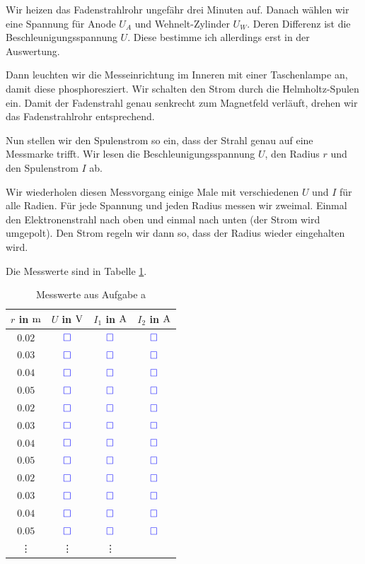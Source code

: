 \documentclass[11pt]{article}
\newcommand{\messwert}{\textcolor{blue}{\square}}
\begin{document}
\label{Durchführung-a}

Wir heizen das Fadenstrahlrohr ungefähr drei Minuten auf. Danach wählen wir
eine Spannung für Anode $U_A$ und Wehnelt-Zylinder $U_W$. Deren Differenz ist
die Beschleunigungsspannung $U$. Diese bestimme ich allerdings erst in der
Auswertung.

Dann leuchten wir die Messeinrichtung im Inneren mit einer Taschenlampe an,
damit diese phosphoresziert. Wir schalten den Strom durch die Helmholtz-Spulen
ein. Damit der Fadenstrahl genau senkrecht zum Magnetfeld verläuft, drehen wir
das Fadenstrahlrohr entsprechend.

Nun stellen wir den Spulenstrom so ein, dass der Strahl genau auf eine
Messmarke trifft. Wir lesen die Beschleunigungsspannung $U$, den Radius $r$ und
den Spulenstrom $I$ ab.

Wir wiederholen diesen Messvorgang einige Male mit verschiedenen $U$ und $I$
für alle Radien. Für jede Spannung und jeden Radius messen wir zweimal. Einmal
den Elektronenstrahl nach oben und einmal nach unten (der Strom wird umgepolt).
Den Strom regeln wir dann so, dass der Radius wieder eingehalten wird.

Die Messwerte sind in Tabelle \ref{table:Aufgabe-a}.

\begin{table}[H]
	\centering

	\begin{tabular}{cccc}
		$r$ in $\unit m$ & $U$ in $\unit V$ & $I_1$ in $\unit A$ & $I_2$ in $\unit A$ \\
		\hline
		$0.02$ & $\messwert$ & $\messwert$ & $\messwert$ \\
		$0.03$ & $\messwert$ & $\messwert$ & $\messwert$ \\
		$0.04$ & $\messwert$ & $\messwert$ & $\messwert$ \\
		$0.05$ & $\messwert$ & $\messwert$ & $\messwert$ \\
		\hline
		$0.02$ & $\messwert$ & $\messwert$ & $\messwert$ \\
		$0.03$ & $\messwert$ & $\messwert$ & $\messwert$ \\
		$0.04$ & $\messwert$ & $\messwert$ & $\messwert$ \\
		$0.05$ & $\messwert$ & $\messwert$ & $\messwert$ \\
		\hline
		$0.02$ & $\messwert$ & $\messwert$ & $\messwert$ \\
		$0.03$ & $\messwert$ & $\messwert$ & $\messwert$ \\
		$0.04$ & $\messwert$ & $\messwert$ & $\messwert$ \\
		$0.05$ & $\messwert$ & $\messwert$ & $\messwert$ \\
		\hline
		   \vdots & \vdots & \vdots
	\end{tabular}

	\caption{Messwerte aus Aufgabe a}
	\label{table:Aufgabe-a}
\end{table}
\end{document}
